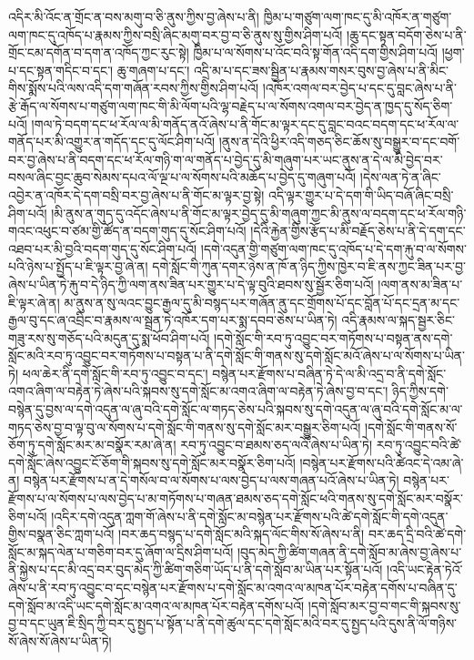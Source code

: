 འདིར་མི་འོང་ན་གྲོང་ན་བས་མགུ་བ་ཅི་ནུས་ཀྱིས་བྱ་ཞེས་པ་ནི། ཁྱིམ་པ་གཙུག་ལག་ཁང་དུ་མི་འཁོར་ན་གཙུག་ལག་ཁང་དུ་འཁོད་པ་རྣམས་ཀྱིས་བསྲི་ཞིང་མགུ་བར་བྱ་བ་ཅི་ནུས་སུ་གྱིས་ཤིག་པའོ། །ཆུ་དང་སྟན་བདོག་ཅེས་པ་ནི་གྲོང་ངམ་དགོན་བ་དག་ན་འཁོད་ཀྱང་རུང་སྟེ། ཁྱིམ་པ་ལ་སོགས་པ་འོང་བའི་སྟ་གོན་འདི་དག་གྱིས་ཤིག་པའོ། །ཕྱག་པ་དང་སྟན་གདིང་བ་དང་། ཆུ་གཞག་པ་དང་། འདྲི་མ་པ་དང་ཟས་སྦྱིན་པ་རྣམས་གསར་བུས་བྱ་ཞེས་པ་ནི་མིང་གིས་སྨོས་པའི་ལས་འདི་དག་གཞོན་རབས་ཀྱིས་གྱིས་ཤིག་པའོ། །འཁོར་འགལ་བར་བྱེད་པ་དང་དུ་བླང་ཞེས་པ་ནི་རྩེ་རྒོད་ལ་སོགས་པ་གཙུག་ལག་ཁང་གི་མི་ལོག་པའི་ལྷ་བརྗེད་པ་ལ་སོགས་འགལ་བར་བྱེད་ན་ཁྱད་དུ་སོད་ཅིག་པའོ། །གལ་ཏེ་བདག་དང་ཕ་རོལ་ལ་མི་གནོད་ནའོ་ཞེས་པ་ནི་གོང་མ་ལྟར་དང་དུ་བླང་བའང་བདག་དང་ཕ་རོལ་ལ་གནོད་པར་མི་འགྱུར་ན་གདོད་དང་དུ་ལོང་ཤིག་པའོ། །ནུས་ན་དེའི་ཕྱིར་འདི་གཅད་ཅིང་ཆོས་སུ་བསྒྱུར་བ་དང་བགོ་བར་བྱ་ཞེས་པ་ནི་བདག་དང་ཕ་རོལ་གཉི་ག་ལ་གནོད་པ་བྱེད་དུ་མི་གཞུག་པར་ཡང་ནུས་ན་དེ་ལ་མི་བྱེད་བར་བསལ་ཞིང་བྱང་ཆུབ་སེམས་དཔའ་ལོ་ལྔ་པ་ལ་སོགས་པའི་མཆོད་པ་བྱེད་དུ་གཞུག་པའོ། །དེས་ལན་ཏེ་ན་ཞིང་འབྱེར་ན་འཁོར་དེ་དག་བསྲི་བར་བྱ་ཞེས་པ་ནི་གོང་མ་ལྟར་བྱ་སྟེ། འདི་ལྟར་གྱུར་པ་དེ་དག་གི་ཡིད་བཞོ་ཞིང་བསྲི་ཤིག་པའོ། །མི་ནུས་ན་གུད་དུ་འདོང་ཞེས་པ་ནི་གོང་མ་ལྟར་བྱེད་དུ་མི་གཞུག་ཀྱང་མི་ནུས་ལ་བདག་དང་ཕ་རོལ་གཉི་གའང་འཕུང་བ་ཙམ་གྱི་ཚོད་ན་བདག་གུད་དུ་སོང་ཤིག་པའོ། །དེའི་རྐྱེན་གྱིས་རྩོད་པ་མི་བརྗོད་ཅེས་པ་ནི་དེ་དག་དང་འཐབ་པར་མི་བྱའི་བདག་གུད་དུ་སོང་ཤིག་པའོ། །དགེ་འདུན་གྱི་གཙུག་ལག་ཁང་དུ་འཁོད་པ་དེ་དག་རྐུ་བ་ལ་སོགས་པའི་ཉེས་པ་སྤྱོད་པ་ཇི་ལྟར་བྱ་ཞེ་ན། དགེ་སློང་གི་ཀུན་དགར་ཉེས་ན་ཁོ་ན་ཉིད་ཀྱིས་ཁྱེར་བ་ཇི་ནས་ཀྱང་ཟིན་པར་བྱ་ཞེས་པ་ཡིན་ཏེ་རྐུ་བ་དེ་ཉིད་ཀྱི་ལག་ནས་ཟིན་པར་གྱུར་པ་དེ་ལྟ་བུའི་ཐབས་སུ་སྦྱོར་ཅིག་པའོ། །ལག་ནས་མ་ཟིན་པ་ཇི་ལྟར་ཞེ་ན། མ་ནུས་ན་སུ་ལའང་བྱུང་རྒྱལ་དུ་མི་བསྙད་པར་གཞོན་ནུ་དང་གྲོགས་པོ་དང་བློན་པོ་དང་དྲན་མ་དང་རྒྱལ་བུ་དང་ཞ་འབྲིང་བ་རྣམས་ལ་སྦྲན་ཏེ་འཁོར་དག་པར་སྨ་དབབ་ཅེས་པ་ཡིན་ཏེ། འདི་རྣམས་ལ་སྐད་སྦྱར་ཅིང་གཟུ་རས་སུ་གཅོད་པའི་མདུན་དུ་སྨ་ཕོབ་ཤིག་པའོ། །དགེ་སློང་གི་རབ་ཏུ་འབྱུང་བར་གཏོགས་པ་བསྟན་ནས་དགེ་སློང་མའི་རབ་ཏུ་འབྱུང་བར་གཏོགས་པ་བསྟན་པ་ནི་དགེ་སློང་གི་གནས་སུ་དགེ་སློང་མའོ་ཞེས་པ་ལ་སོགས་པ་ཡིན་ཏེ། ཕལ་ཆེར་ནི་དགེ་སློང་གི་རབ་ཏུ་འབྱུང་བ་དང་། བསྙེན་པར་རྫོགས་པ་བཞིན་ཏེ་དེ་ལ་མི་འདྲ་བ་ནི་དགེ་སློང་འགའ་ཞིག་ལ་བརྟེན་ཏེ་ཞེས་པའི་སྐབས་སུ་དགེ་སློང་མ་འགའ་ཞིག་ལ་བརྟེན་ཏེ་ཞེས་བྱ་བ་དང་། ཉིད་ཀྱིས་དགེ་བསྙེན་དུ་བྱས་ལ་དགེ་འདུན་ལ་ཞུ་བའི་དགེ་སློང་ལ་གཏད་ཅེས་པའི་སྐབས་སུ་དགེ་འདུན་ལ་ཞུ་བའི་དགེ་སློང་མ་ལ་གཏད་ཅེས་བྱ་བ་ལྟ་བུ་ལ་སོགས་པ་དགེ་སློང་གི་གནས་སུ་དགེ་སློང་མར་བསྒྱུར་ཅིག་པའོ། །དགེ་སློང་གི་གནས་སོ་ཅོག་ཏུ་དགེ་སློང་མར་མ་བསྣོར་རམ་ཞེ་ན། རབ་ཏུ་འབྱུང་བ་ཐམས་ཅད་ལའོ་ཞེས་པ་ཡིན་ཏེ། རབ་ཏུ་འབྱུང་བའི་ཚེ་དགེ་སློང་ཞེས་འབྱུང་ངོ་ཅོག་གི་སྐབས་སུ་དགེ་སློང་མར་བསྣོར་ཅིག་པའོ། །བསྙེན་པར་རྫོགས་པའི་ཚེའང་དེ་འམ་ཞེ་ན། བསྙེན་པར་རྫོགས་པ་ན་དེ་གསོལ་བ་ལ་སོགས་པ་ལས་བྱེད་པ་ལས་གཞན་པའོ་ཞེས་པ་ཡིན་ཏེ། བསྙེན་པར་རྫོགས་པ་ལ་སོགས་པ་ལས་བྱེད་པ་མ་གཏོགས་པ་གཞན་ཐམས་ཅད་དགེ་སློང་ཕའི་གནས་སུ་དགེ་སློང་མར་བསྣོར་ཅིག་པའོ། །འདིར་དགེ་འདུན་ཀླག་གོ་ཞེས་པ་ནི་དགེ་སློང་མ་བསྙེན་པར་རྫོགས་པའི་ཚེ་དགེ་སློང་གི་དགེ་འདུན་གྱིས་བསྣན་ཅིང་ཀླག་པའོ། །བར་ཆད་བསྙད་པ་དགེ་སློང་མའི་སྐད་ལོང་གིས་སོ་ཞེས་པ་ནི། བར་ཆད་དྲི་བའི་ཚེ་དགེ་སློང་མ་སྐད་ལེན་པ་གཅིག་བར་དུ་ཞོག་ལ་དྲིས་ཤིག་པའོ། །བུད་མེད་ཀྱི་ཚིག་གཞན་ནི་དགེ་སློབ་མ་ཞེས་བྱ་ཞེས་པ་ནི་སྐྱེས་པ་དང་མི་འདྲ་བར་བུད་མེད་ཀྱི་ཚིག་གཅིག་ཡོད་པ་ནི་དགེ་སློབ་མ་ཡིན་པར་སྟོན་པའོ། །འདི་ཡང་རྟེན་ཏེའོ་ཞེས་པ་ནི་རབ་ཏུ་འབྱུང་བ་དང་བསྙེན་པར་རྫོགས་པ་དགེ་སློང་མ་འགའ་ལ་མཁན་པོར་བརྟེན་དགོས་པ་བཞིན་དུ་དགེ་སློབ་མ་འདི་ཡང་དགེ་སློང་མ་འགའ་ལ་མཁན་པོར་བརྟེན་དགོས་པའོ། །དགེ་སློབ་མར་བྱ་བ་གང་གི་སྐབས་སུ་བྱ་བ་དང་ཡུན་ཇི་སྲིད་ཀྱི་བར་དུ་སྤྱད་པ་སྟོན་པ་ནི་དགེ་ཚུལ་དང་དགེ་སློང་མའི་བར་དུ་སྤྱད་པའི་དུས་ནི་ལོ་གཉིས་སོ་ཞེས་སོ་ཞེས་པ་ཡིན་ཏེ། 